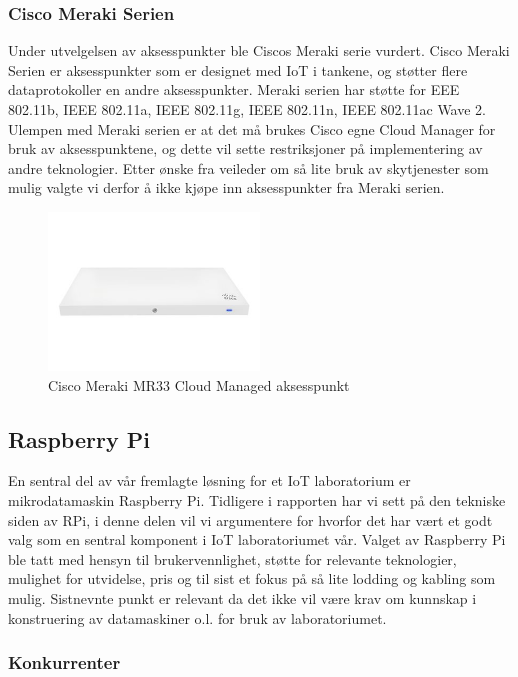 \documentclass{article}
\begin{document}
\subsubsection{Cisco Meraki Serien}
Under utvelgelsen av aksesspunkter ble Ciscos Meraki\cite{ciscomeraki} serie vurdert. Cisco Meraki Serien er aksesspunkter som er designet med IoT i tankene, og støtter flere dataprotokoller en andre aksesspunkter. Meraki serien har støtte for EEE 802.11b, IEEE 802.11a, IEEE 802.11g, IEEE 802.11n, IEEE 802.11ac Wave 2. Ulempen med Meraki serien er at det må brukes Cisco egne Cloud Manager for bruk av aksesspunktene, og dette vil sette restriksjoner på implementering av andre teknologier. Etter ønske fra veileder om så lite bruk av skytjenester som mulig valgte vi derfor å ikke kjøpe inn aksesspunkter fra Meraki serien.

\begin{figure}[!ht]
  \centering
      \includegraphics[width=0.5\textwidth]{ciscomeraki}
  \caption {Cisco Meraki MR33 Cloud Managed aksesspunkt}
\end{figure}


\subsection{Raspberry Pi}
En sentral del av vår fremlagte løsning for et IoT laboratorium er mikrodatamaskin Raspberry Pi. Tidligere i rapporten har vi sett på den tekniske siden av RPi, i denne delen vil vi argumentere for hvorfor det har vært et godt valg som en sentral komponent i IoT laboratoriumet vår. Valget av Raspberry Pi ble tatt med hensyn til brukervennlighet, støtte for relevante teknologier, mulighet for utvidelse, pris og til sist et fokus på så lite lodding og kabling som mulig. Sistnevnte punkt er relevant da det ikke vil være krav om kunnskap i konstruering av datamaskiner o.l. for bruk av laboratoriumet. 

\subsubsection{Konkurrenter}
\end{document}
